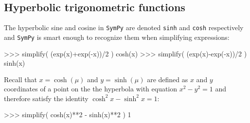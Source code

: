 
\subsection{Hyperbolic trigonometric functions}
\label{basics:hyperbolic_trigonometric_functions}

The hyperbolic sine and cosine in \texttt{SymPy} are denoted \texttt{sinh} and \texttt{cosh} respectively
and \texttt{SymPy} is smart enough to recognize them when simplifying expressions:

\small
\begin{verbatimtab}
>>> simplify( (exp(x)+exp(-x))/2 )
cosh(x)
>>> simplify( (exp(x)-exp(-x))/2 )
sinh(x)
\end{verbatimtab}
\normalsize
Recall that $x=\cosh(\mu)$ and $y=\sinh(\mu)$ are defined as $x$ and $y$ coordinates of a point on the 
the hyperbola with equation $x^2 - y^2 = 1$ and therefore satisfy the identity $\cosh^2 x - \sinh^2 x =1$:



\small
\begin{verbatimtab}
>>> simplify( cosh(x)**2 - sinh(x)**2 )
1
\end{verbatimtab}
\normalsize
